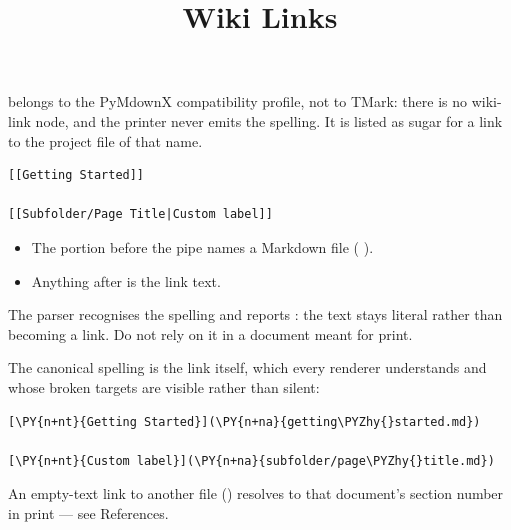 \documentclass[a4paper,twoside]{article}
\title{Wiki Links}
\author{}\date{}
\begin{document}
\maketitle
{} belongs to the PyMdownX compatibility profile, not to TMark:
there is no wiki-link node, and the printer never emits the spelling. It is
listed as sugar for a link to the project file of that name.
\begin{tscode}[lang=md, engine=pygments]
\begin{Verbatim}[commandchars=\\\{\},breaklines, breakanywhere, commandchars=\\\{\}]
[[Getting Started]]

[[Subfolder/Page Title|Custom label]]
\end{Verbatim}
\end{tscode}
\begin{itemize}
\item The portion before the pipe names a Markdown file ( 
).
\item Anything after \tscodeinline{|} is the link text.
\end{itemize}
\begin{tscallout}[kind=warning, title={Not implemented yet}]
The parser recognises the spelling and reports : the
text stays literal rather than becoming a link. Do not rely on it in a
document meant for print.
\end{tscallout}
The canonical spelling is the link itself, which every renderer understands and
whose broken targets are visible rather than silent:
\begin{tscode}[lang=md, engine=pygments]
\begin{Verbatim}[commandchars=\\\{\},breaklines, breakanywhere, commandchars=\\\{\}]
[\PY{n+nt}{Getting Started}](\PY{n+na}{getting\PYZhy{}started.md})

[\PY{n+nt}{Custom label}](\PY{n+na}{subfolder/page\PYZhy{}title.md})
\end{Verbatim}
\end{tscode}
An empty-text link to another file () resolves to that
document's section number in print --- see References.
\end{document}
